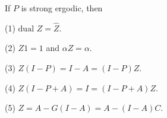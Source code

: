 If $P$ is strong ergodic, then

(1) $\text{dual } Z = \hat{Z}$.

(2) $Z1 = 1$ and $\alpha Z = \alpha$.

(3) $Z(I - P) = I - A = (I - P)Z$.

(4) $Z(I - P + A) = I = (I - P + A)Z$.

(5) $Z = A - G(I - A) = A - (I - A)C$.
